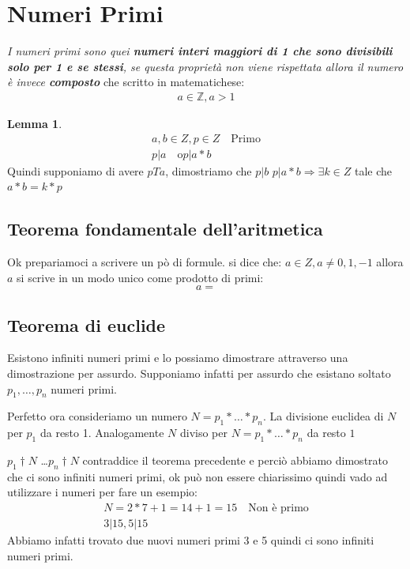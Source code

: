 \documentclass{article}
\theoremstyle{definition}
\newtheorem{lemma}{Lemma}[section]
\begin{document}
\newpage
\section{Numeri Primi}\label{sec:numeri_primi}
\textit{I numeri primi sono quei \textbf{numeri interi maggiori di 1 che sono divisibili solo per 1 e se stessi}, se questa proprietà non viene rispettata allora il numero è invece \textbf{composto}} che scritto in matematichese:
\begin{align}
       a \in \mathbb{Z}, a>1
\end{align}

\begin{lemma}
        
\begin{align}
        a,b \in Z, p \in Z \quad \textrm{Primo} \\
        p | a \quad \textrm{o} p | a*b
\end{align}
Quindi supponiamo di avere $p T a$, dimostriamo che $p|b$
$p | a*b \Rightarrow \exists k \in Z$ tale che $a*b = k*p$
\end{lemma}



\subsection{Teorema fondamentale dell'aritmetica}
Ok prepariamoci a scrivere un pò di formule. \newline
si dice che: $a \in Z, a \not = 0,1,-1$ allora $a$ si scrive in un modo unico come prodotto di primi:
\begin{equation}
a =
\end{equation}



\subsection{Teorema di euclide}
Esistono infiniti numeri primi e lo possiamo dimostrare attraverso una dimostrazione per assurdo.
Supponiamo infatti per assurdo che esistano soltato $p_1,\ldots,p_n$ numeri primi. \par
Perfetto ora consideriamo un numero $N = p_1* \ldots * p_n$.
La divisione euclidea di $N$ per $p_1$ da resto 1.
Analogamente $N$ diviso per $N = p_1* \ldots * p_n$ da resto $1$ \par

$p_1 \dag N$ \ldots  $p_n \dag N$ contraddice il teorema precedente e perciò abbiamo dimostrato che ci sono infiniti numeri primi, ok può non essere chiarissimo quindi vado ad utilizzare i numeri per fare un esempio:
\begin{align*}
        N = 2 * 7 + 1 = 14 + 1 = 15 \quad \textrm{Non è primo} \\
        3 | 15, 5 | 15
\end{align*}
Abbiamo infatti trovato due nuovi numeri primi 3 e 5 quindi ci sono infiniti numeri primi.
\end{document}
